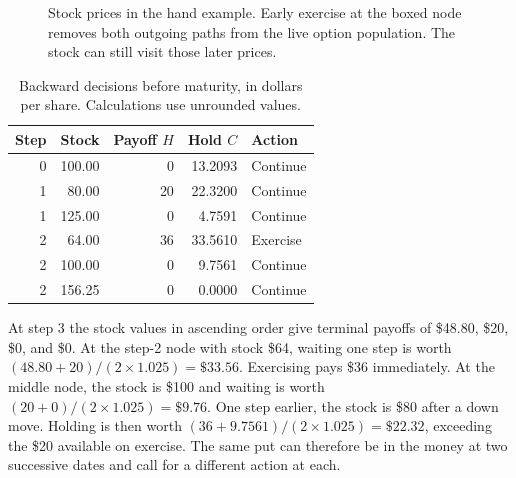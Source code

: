 \documentclass[11pt]{article}
\begin{document}
\begin{figure}[ht]
\centering
{}
\caption{Stock prices in the hand example. Early exercise at the boxed node removes both outgoing paths from the live option population. The stock can still visit those later prices.}
\label{fig:tree}
\end{figure}

\begin{table}[ht]
\centering\small
\begin{tabular}{rrrrl}
\toprule
Step & Stock & Payoff $H$ & Hold $C$ & Action\\
\midrule
0 & 100.00 & 0 & 13.2093 & Continue\\
1 & 80.00 & 20 & 22.3200 & Continue\\
1 & 125.00 & 0 & 4.7591 & Continue\\
2 & 64.00 & 36 & 33.5610 & Exercise\\
2 & 100.00 & 0 & 9.7561 & Continue\\
2 & 156.25 & 0 & 0.0000 & Continue\\
\bottomrule
\end{tabular}
\caption{Backward decisions before maturity, in dollars per share. Calculations use unrounded values.}
\label{tab:hand}
\end{table}

At step 3 the stock values in ascending order give terminal payoffs of \$48.80, \$20, \$0, and \$0. At the step-2 node with stock \$64, waiting one step is worth $(48.80+20)/(2\times1.025)=\$33.56$. Exercising pays \$36 immediately. At the middle node, the stock is \$100 and waiting is worth $(20+0)/(2\times1.025)=\$9.76$. One step earlier, the stock is \$80 after a down move. Holding is then worth $(36+9.7561)/(2\times1.025)=\$22.32$, exceeding the \$20 available on exercise. The same put can therefore be in the money at two successive dates and call for a different action at each.
\end{document}
